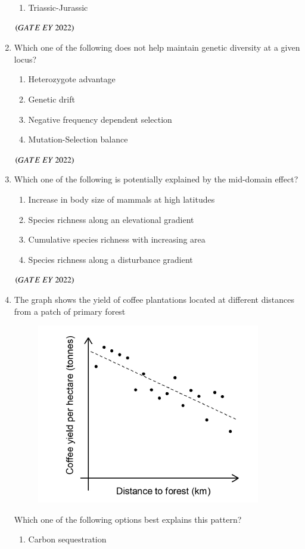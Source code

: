 \documentclass[journal]{IEEEtran}
\numberwithin{equation}{enumi}
\numberwithin{figure}{enumi}
\begin{document}
\begin{enumerate}
\begin{enumerate}
        \item  Triassic-Jurassic
    \end{enumerate}
    \hfill{$\brak{ GATE\ EY\ 2022}$}
    \bigskip
 \item Which one of the following does not help maintain genetic diversity at a given
locus?
    \begin{enumerate}
        \item  Heterozygote advantage
        \item  Genetic drift
        \item  Negative frequency dependent selection
        \item  Mutation-Selection balance
    \end{enumerate}
    \hfill{$\brak{ GATE\ EY\ 2022}$}
    \bigskip
 \item Which one of the following is potentially explained by the mid-domain effect?
    \begin{enumerate}
        \item  Increase in body size of mammals at high latitudes
        \item  Species richness along an elevational gradient
        \item  Cumulative species richness with increasing area
        \item  Species richness along a disturbance gradient
    \end{enumerate}
    \hfill{$\brak{ GATE\ EY\ 2022}$}
    \bigskip
 \item The graph shows the yield of coffee plantations located at different distances from
a patch of primary forest
\begin{figure}[H]
    \centering
\includegraphics[width=0.5\columnwidth]{figs/6.png}
    \caption{}
    \label{fig:6}
   \end{figure}
Which one of the following options best explains this pattern?
    \begin{enumerate}
        \item  Carbon sequestration

\end{enumerate}
\end{enumerate}
\end{document}

